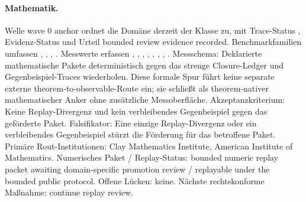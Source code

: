 \paragraph{Mathematik.}
Welle wave 0 anchor ordnet die Domäne derzeit der Klasse  zu, mit Trace-Status , Evidenz-Status  und Urteil bounded review evidence recorded.
Benchmarkfamilien umfassen , \allowbreak {}, \allowbreak {}, \allowbreak {}.
Messwerte erfassen , \allowbreak {}, \allowbreak {}, \allowbreak {}, \allowbreak {}, \allowbreak {}, \allowbreak {}, \allowbreak {}.
Messschema: Deklarierte mathematische Pakete deterministisch gegen das strenge Closure-Ledger und Gegenbeispiel-Traces wiederholen.
Diese formale Spur führt keine separate externe theorem-to-observable-Route ein; sie schließt als theorem-nativer mathematischer Anker ohne zusätzliche Messoberfläche.
Akzeptanzkriterium: Keine Replay-Divergenz und kein verbleibendes Gegenbeispiel gegen das geförderte Paket.
Falsifikator: Eine einzige Replay-Divergenz oder ein verbleibendes Gegenbeispiel stürzt die Förderung für das betroffene Paket.
Primäre Rout-Institutionen: Clay Mathematics Institute, \allowbreak American Institute of Mathematics.
Numerisches Paket / Replay-Status: bounded numeric replay packet awaiting domain-specific promotion review / replayable under the bounded public protocol.
Offene Lücken: keine.
Nächste rechtskonforme Maßnahme: continue replay review.


